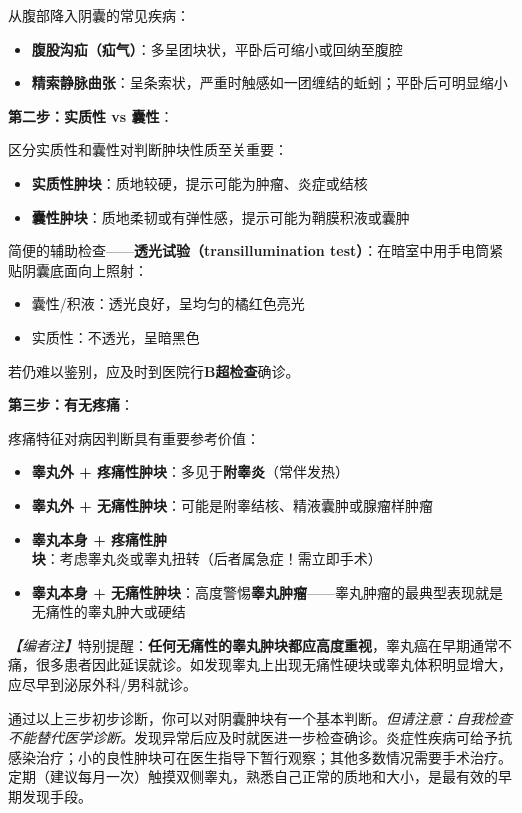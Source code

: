 从腹部降入阴囊的常见疾病：
\begin{itemize}
	\item \textbf{腹股沟疝（疝气）}：多呈团块状，平卧后可缩小或回纳至腹腔
	\item \textbf{精索静脉曲张}：呈条索状，严重时触感如一团缠结的蚯蚓；平卧后可明显缩小
\end{itemize}

\vspace{0.5em}
\noindent\textbf{第二步：实质性 vs 囊性}：

区分实质性和囊性对判断肿块性质至关重要：
\begin{itemize}
	\item \textbf{实质性肿块}：质地较硬，提示可能为肿瘤、炎症或结核
	\item \textbf{囊性肿块}：质地柔韧或有弹性感，提示可能为鞘膜积液或囊肿
\end{itemize}

简便的辅助检查——\textbf{透光试验（transillumination test）}：在暗室中用手电筒紧贴阴囊底面向上照射：
\begin{itemize}
	\item 囊性/积液：透光良好，呈均匀的橘红色亮光
	\item 实质性：不透光，呈暗黑色
\end{itemize}

若仍难以鉴别，应及时到医院行\textbf{B超检查}确诊。

\vspace{0.5em}
\noindent\textbf{第三步：有无疼痛}：

疼痛特征对病因判断具有重要参考价值：

\begin{itemize}
	\item \textbf{睾丸外 + 疼痛性肿块}：多见于\textbf{附睾炎}（常伴发热）
	\item \textbf{睾丸外 + 无痛性肿块}：可能是附睾结核、精液囊肿或腺瘤样肿瘤
	\item \textbf{睾丸本身 + 疼痛性肿块}：考虑睾丸炎或睾丸扭转（后者属急症！需立即手术）
	\item \textbf{睾丸本身 + 无痛性肿块}：高度警惕\textbf{睾丸肿瘤}——睾丸肿瘤的最典型表现就是无痛性的睾丸肿大或硬结
\end{itemize}

\noindent\textit{【编者注】}特别提醒：\textbf{任何无痛性的睾丸肿块都应高度重视}，睾丸癌在早期通常不痛，很多患者因此延误就诊。如发现睾丸上出现无痛性硬块或睾丸体积明显增大，应尽早到泌尿外科/男科就诊。

\begin{tcolorbox}[colback=pink!5!white,colframe=red!50!black,title=贴心小叮咛]
通过以上三步初步诊断，你可以对阴囊肿块有一个基本判断。\textit{但请注意：自我检查不能替代医学诊断。}发现异常后应及时就医进一步检查确诊。炎症性疾病可给予抗感染治疗；小的良性肿块可在医生指导下暂行观察；其他多数情况需要手术治疗。定期（建议每月一次）触摸双侧睾丸，熟悉自己正常的质地和大小，是最有效的早期发现手段。
\end{tcolorbox}

